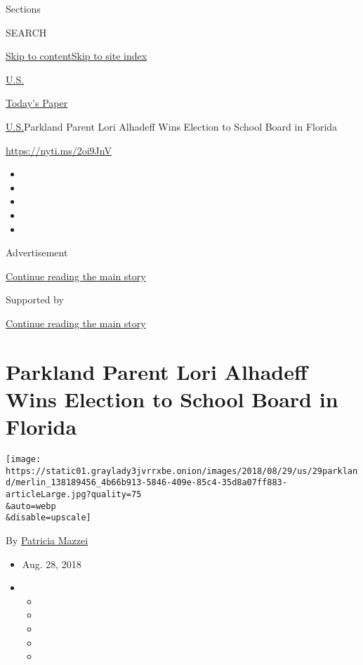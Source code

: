 Sections

SEARCH

\protect\hyperlink{site-content}{Skip to
content}\protect\hyperlink{site-index}{Skip to site index}

\href{https://www.nytimes3xbfgragh.onion/section/us}{U.S.}

\href{https://myaccount.nytimes3xbfgragh.onion/auth/login?response_type=cookie\&client_id=vi}{}

\href{https://www.nytimes3xbfgragh.onion/section/todayspaper}{Today's
Paper}

\href{/section/us}{U.S.}\textbar{}Parkland Parent Lori Alhadeff Wins
Election to School Board in Florida

\url{https://nyti.ms/2oi9JnV}

\begin{itemize}
\item
\item
\item
\item
\item
\end{itemize}

Advertisement

\protect\hyperlink{after-top}{Continue reading the main story}

Supported by

\protect\hyperlink{after-sponsor}{Continue reading the main story}

\hypertarget{parkland-parent-lori-alhadeff-wins-election-to-school-board-in-florida}{%
\section{Parkland Parent Lori Alhadeff Wins Election to School Board in
Florida}\label{parkland-parent-lori-alhadeff-wins-election-to-school-board-in-florida}}

\texttt{[image: https://static01.graylady3jvrrxbe.onion/images/2018/08/29/us/29parkland/merlin\_138189456\_4b66b913-5846-409e-85c4-35d8a07ff883-articleLarge.jpg?quality=75\\\&auto=webp\\\&disable=upscale]}

By \href{https://www.nytimes3xbfgragh.onion/by/patricia-mazzei}{Patricia
Mazzei}

\begin{itemize}
\item
  Aug. 28, 2018
\item
  \begin{itemize}
  \item
  \item
  \item
  \item
  \item
  \end{itemize}
\end{itemize}

